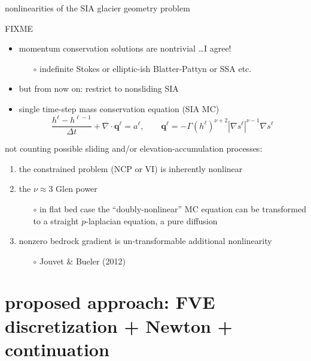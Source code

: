 \documentclass[xcolor={dvipsnames}]{beamer}
\newcommand\bq{\mathbf{q}}
\newcommand\Div{\nabla\cdot}
\newcommand\grad{\nabla}
\begin{document}
\begin{frame}{nonlinearities of the SIA glacier geometry problem}

FIXME

\begin{itemize}
\item momentum conservation solutions are nontrivial \dots I agree!
    \begin{itemize}
    \item[$\circ$] indefinite Stokes or elliptic-ish Blatter-Pattyn or SSA etc.
    \end{itemize}
\item but from now on: restrict to nonsliding SIA
\item single time-step mass conservation equation (SIA MC)
    $$\frac{h^\ell - h^{\ell-1}}{\Delta t} + \Div \bq^\ell = a^\ell, \qquad \bq^\ell = - \Gamma (h^\ell)^{\nu+2} |\grad s^\ell|^{\nu-1} \grad s^\ell$$
\end{itemize}

not counting possible sliding and/or elevation-accumulation processes:
\begin{enumerate}
\item the constrained problem (NCP or VI) is inherently nonlinear
\item the $\nu\approx 3$ Glen power
    \begin{itemize}
    \item[$\circ$] in flat bed case the ``doubly-nonlinear'' MC equation can be transformed to a straight $p$-laplacian equation, a pure diffusion
    \end{itemize}
\item nonzero bedrock gradient is un-transformable additional nonlinearity
    \begin{itemize}
    \item[$\circ$] Jouvet \& Bueler (2012)
    \end{itemize}
\end{enumerate}
\end{frame}


\section{proposed approach: FVE discretization + Newton + continuation}
\end{document}
